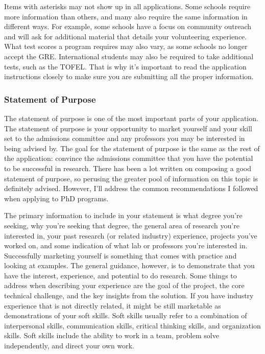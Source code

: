 \documentclass[12pt]{article}
\begin{document}
Items with asterisks may not show up in all applications. Some schools require more information than others, and many also require the same information in different ways. For example, some schools have a focus on community outreach and will ask for additional material that details your volunteering experience. What test scores a program requires may also vary, as some schools no longer accept the GRE. International students may also be required to take additional tests, such as the TOFEL. That is why it's important to read the application instructions closely to make sure you are submitting all the proper information.

\subsubsection{Statement of Purpose}

The statement of purpose is one of the most important parts of your application. The statement of purpose is your opportunity to market yourself and your skill set to the admissions committee and any professors you may be interested in being advised by. The goal for the statement of purpose is the same as the rest of the application: convince the admissions committee that you have the potential to be successful in research. There has been a lot written on composing a good statement of purpose, so perusing the greater pool of information on this topic is definitely advised. However, I'll address the common recommendations I followed when applying to PhD programs.

The primary information to include in your statement is what degree you're seeking, why you're seeking that degree, the general area of research you're interested in, your past research (or related industry) experience, projects you've worked on, and some indication of what lab or professors you're interested in. Successfully marketing yourself is something that comes with practice and looking at examples. The general guidance, however, is to demonstrate that you have the interest, experience, and potential to do research. \cite{mightgradguide} Some things to address when describing your experience are the goal of the project, the core technical challenge, and the key insights from the solution. \cite{mightgradguide} If you have industry experience that is not directly related, it might be still marketable as demonstrations of your soft skills. Soft skills usually refer to a combination of interpersonal skills, communication skills, critical thinking skills, and organization skills. \cite{cotesoftskills} Soft skills include the ability to work in a team, problem solve independently, and direct your own work.
\end{document}
